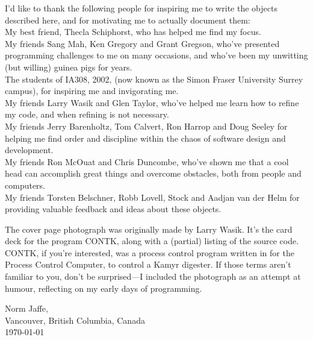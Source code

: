 \newpage
I'd like to thank the following people for inspiring me to write the objects described here, and for motivating me to actually
document them:\\
My best friend, Thecla Schiphorst, who has helped me find my focus.\\
My friends Sang Mah, Ken Gregory and Grant Gregson, who've presented \MaxName{} programming challenges to me on many occasions, and
who've been my unwitting (but willing) guinea pigs for years.\\
The students of IA308, 2002,  (now known as the Simon Fraser University Surrey campus),
for inspiring me and invigorating me.\\
My friends Larry Wasik and Glen Taylor, who've helped me learn how to refine my code, and when refining is not necessary.\\
My friends Jerry Barenholtz, Tom Calvert, Ron Harrop and Doug Seeley for helping me find order and discipline within the chaos
of software design and development.\\
My friends Ron McOuat and Chris Duncombe, who've shown me that a cool head can accomplish great things and overcome obstacles,
both from people and computers.\\
My friends Torsten Belschner, Robb Lovell, Stock and Aadjan van der Helm for providing valuable feedback and ideas about
these objects.

\vspace{1ex}
The cover page photograph was originally made by Larry Wasik.
It's the card deck for the program CONTK, along with a (partial) listing of the source code.
CONTK, if you're interested, was a process control program written in  for the  Process Control Computer,
to control a Kamyr digester.
If those terms aren't familiar to you, don't be surprised---I included the photograph as an attempt at humour, reflecting on
my early days of programming.

\vspace{1ex}
\begin{flushleft}
Norm Jaffe,\\
Vancouver, British Columbia, Canada\\
\today
\end{flushleft}

\vspace{\fill}

